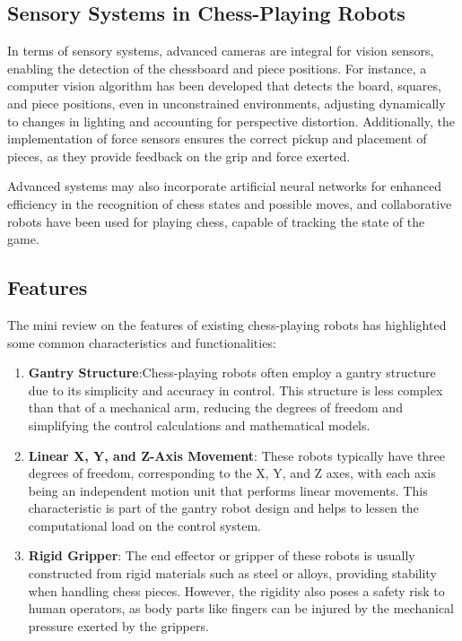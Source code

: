 \documentclass[10pt, a4paper, twocolumn]{article}
\begin{document}
\subsection{Sensory Systems in Chess-Playing Robots}
In terms of sensory systems, advanced cameras are integral for vision sensors, enabling the detection of the chessboard and piece positions. For instance, a computer vision algorithm has been developed that detects the board, squares, and piece positions, even in unconstrained environments, adjusting dynamically to changes in lighting and accounting for perspective distortion\cite{chen2019robust}. Additionally, the implementation of force sensors ensures the correct pickup and placement of pieces, as they provide feedback on the grip and force exerted\cite{omarsdottir2016axiomatic}.

Advanced systems may also incorporate artificial neural networks for enhanced efficiency in the recognition of chess states and possible moves, and collaborative robots have been used for playing chess, capable of tracking the state of the game\cite{kolosowski2020collaborative}.

\subsection{Features}
The mini review on the features of existing chess-playing robots has highlighted some common characteristics and functionalities:

\begin{enumerate}
    \item \textbf{Gantry Structure}:Chess-playing robots often employ a gantry structure due to its simplicity and accuracy in control. This structure is less complex than that of a mechanical arm, reducing the degrees of freedom and simplifying the control calculations and mathematical models.\cite{rao2023robot}
    
    \item \textbf{Linear X, Y, and Z-Axis Movement}: These robots typically have three degrees of freedom, corresponding to the X, Y, and Z axes, with each axis being an independent motion unit that performs linear movements. This characteristic is part of the gantry robot design and helps to lessen the computational load on the control system.\cite{du2013compliance}\cite{gupta2015autonomous}

    \item \textbf{Rigid Gripper}: The end effector or gripper of these robots is usually constructed from rigid materials such as steel or alloys, providing stability when handling chess pieces. However, the rigidity also poses a safety risk to human operators, as body parts like fingers can be injured by the mechanical pressure exerted by the grippers.
\end{enumerate}
\end{document}
